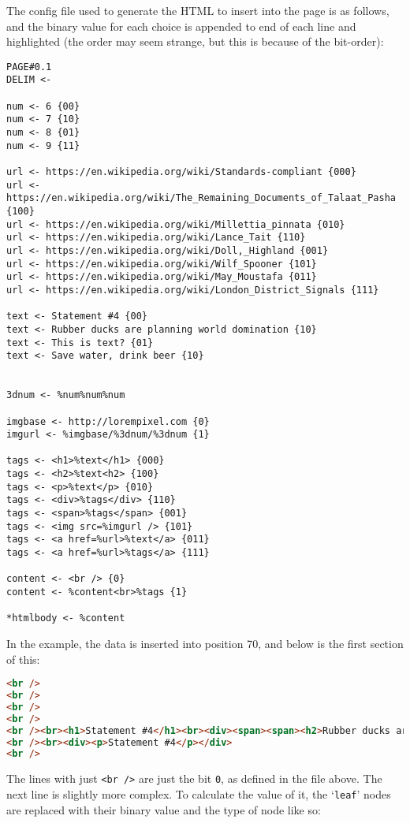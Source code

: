 The config file used to generate the HTML to insert into the page is as follows, and the binary value for each choice is appended to end of each line and highlighted (the order may seem strange, but this is because of the bit-order):
\begin{lstlisting}[language=pagefile]
PAGE#0.1
DELIM <-

num <- 6 {00}
num <- 7 {10}
num <- 8 {01} 
num <- 9 {11}

url <- https://en.wikipedia.org/wiki/Standards-compliant {000}
url <- https://en.wikipedia.org/wiki/The_Remaining_Documents_of_Talaat_Pasha {100}
url <- https://en.wikipedia.org/wiki/Millettia_pinnata {010}
url <- https://en.wikipedia.org/wiki/Lance_Tait {110}
url <- https://en.wikipedia.org/wiki/Doll,_Highland {001}
url <- https://en.wikipedia.org/wiki/Wilf_Spooner {101}
url <- https://en.wikipedia.org/wiki/May_Moustafa {011}
url <- https://en.wikipedia.org/wiki/London_District_Signals {111}

text <- Statement #4 {00}
text <- Rubber ducks are planning world domination {10}
text <- This is text? {01}
text <- Save water, drink beer {10}


3dnum <- %num%num%num

imgbase <- http://lorempixel.com {0}
imgurl <- %imgbase/%3dnum/%3dnum {1}

tags <- <h1>%text</h1> {000}
tags <- <h2>%text<h2> {100}
tags <- <p>%text</p> {010}
tags <- <div>%tags</div> {110}
tags <- <span>%tags</span> {001}
tags <- <img src=%imgurl /> {101}
tags <- <a href=%url>%text</a> {011}
tags <- <a href=%url>%tags</a> {111}

content <- <br /> {0}
content <- %content<br>%tags {1}

*htmlbody <- %content
\end{lstlisting}
In the example, the data is inserted into position 70, and below is the first section of this:
\begin{lstlisting}[language=HTML,numbers=none]
<br />
<br />
<br />
<br />
<br /><br><h1>Statement #4</h1><br><div><span><span><h2>Rubber ducks are planning world domination<h2></span></span></div>
<br /><br><div><p>Statement #4</p></div>
<br />
\end{lstlisting}
The lines with just \texttt{<br />} are just the bit \texttt{0}, as defined in the file above.
The next line is slightly more complex.
To calculate the value of it, the `\texttt{leaf}' nodes are replaced with their binary value and the type of node like so:
\begin{lstlisting}[numbers=none]
%content:0%<br><h1>%text:00%</h1><br><div><span><span><h2>%text:10%<h2></span></span></div>
\end{lstlisting}
